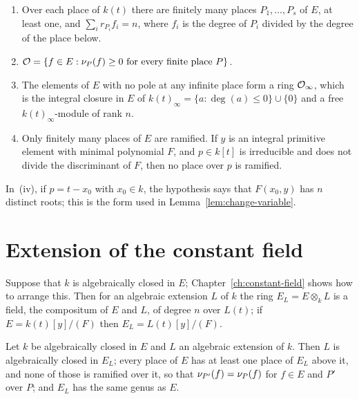 \begin{theorem}\label{thm:places}
\begin{enumerate}[label=\textup{(\roman*)}]
\item Over each place of $k(t)$ there are finitely many places $P_1, \dots,
  P_s$ of $E$, at least one, and $\sum_i r_{P_i} f_i = n$, where $f_i$ is the
  degree of $P_i$ divided by the degree of the place below.
\item $\mathcal{O} = \{ f \in E : \nu_{P}(f) \ge 0 \text{ for every finite place } P
  \}$.
\item The elements of $E$ with no pole at any infinite place form a ring
  $\mathcal{O}_\infty$, which is the integral closure in $E$ of $k(t)_\infty = \{ a :
  \deg(a) \le 0 \} \cup \{0\}$ and a free $k(t)_\infty$-module of rank $n$.
\item Only finitely many places of $E$ are ramified. If $y$ is an integral
  primitive element with minimal polynomial $F$, and $p \in k[t]$ is
  irreducible and does not divide the discriminant of $F$, then no place over
  $p$ is ramified.
\end{enumerate}
\end{theorem}

In~(iv), if $p = t - x_0$ with $x_0 \in k$, the hypothesis says that $F(x_0,
y)$ has $n$ distinct roots; this is the form used in
Lemma~\ref{lem:change-variable}.

\section{Extension of the constant field}\label{sec:ff-constants}

Suppose that $k$ is algebraically closed in $E$; Chapter~\ref{ch:constant-field}
shows how to arrange this. Then for an algebraic extension $L$ of $k$ the
ring $E_L = E \otimes_k L$ is a field, the compositum of $E$ and $L$, of
degree $n$ over $L(t)$; if $E = k(t)[y]/(F)$ then $E_L = L(t)[y]/(F)$.

\begin{theorem}\label{thm:constant-extension}
Let $k$ be algebraically closed in $E$ and $L$ an algebraic extension of $k$.
Then $L$ is algebraically closed in $E_L$; every place of $E$ has at least
one place of $E_L$ above it, and none of those is ramified over it, so that
$\nu_{P'}(f) = \nu_{P}(f)$ for $f \in E$ and $P'$ over $P$; and $E_L$ has the
same genus as $E$.
\end{theorem}

